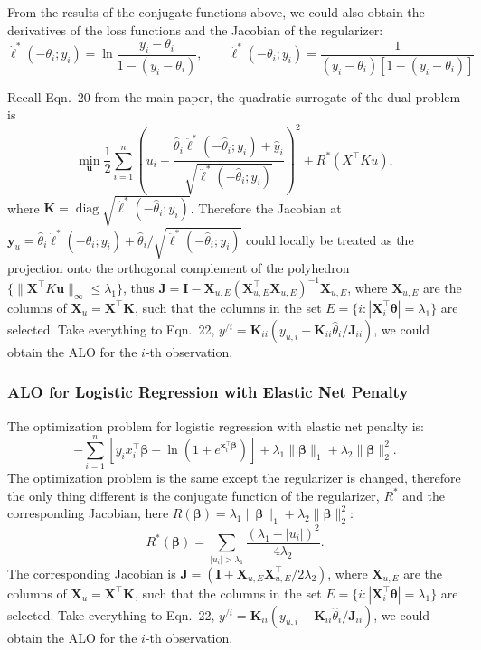 \documentclass[11pt]{article}
\newcommand{\bu}{\bm{u}}
\newcommand{\bx}{\bm{x}}
\newcommand{\by}{\bm{y}}
\newcommand{\bI}{\bm{I}}
\newcommand{\bJ}{\bm{J}}
\newcommand{\bK}{\bm{K}}
\newcommand{\bX}{\bm{X}}
\newcommand{\bbeta}{\bm{\beta}}
\newcommand{\btheta}{\bm{\theta}}
\DeclareMathOperator{\diag}{diag}
\newcommand{\refthm}[2]{#1~#2}
\begin{document}
From the results of the conjugate functions above, we could also obtain the derivatives of the loss functions and the Jacobian of the regularizer: \[\dot{\ell}^{*}(-\theta_{i};y_{i}) = \ln \frac{y_{i}-\theta_{i}}{1-(y_{i}-\theta_{i})},\qquad \ddot{\ell}^{*}(-\theta_{i};y_{i}) = \frac{1}{(y_{i}-\theta_{i})[1-(y_{i}-\theta_{i})]}\]

Recall \refthm{Eqn.}{20} from the main paper, the quadratic surrogate of the dual problem is \[\min\limits_{\bu} \frac{1}{2}\sum_{i=1}^n\left(u_{i}-\frac{\hat{\theta}_{i}\ddot{\ell}^{*}(-\hat{\theta}_{i};y_{i})+\hat{y}_{i}}{\sqrt{\ddot{\ell}^{*}(-\hat{\theta}_{i};y_{i})}}\right)^{2}+R^{*}(X^{\top}Ku),\] where $\bK=\diag\sqrt{\ddot{\ell}^{*}(-\hat{\theta}_{i};y_{i})}$. Therefore the Jacobian at $\by_{u} =\hat{\theta}_{i}\ddot{\ell}^{*}(-\hat{\theta}_{i};y_{i})+\hat{\theta}_{i}/\sqrt{\ddot{\ell}^{*}(-\hat{\theta}_{i};y_{i})}$ could locally be treated as the projection onto the orthogonal complement of the polyhedron $\{\|\bX^{\top}K\bu\|_{\infty} \leq \lambda_{1}\}$, thus $\bJ = \bI - \bX_{u,E}(\bX_{u,E}^{\top}\bX_{u,E})^{-1}\bX_{u,E}$, where $\bX_{u,E}$ are the columns of $\bX_{u}=\bX^{\top}\bK$, such that the columns in the set $E = \{i:|\bX_{i}^{\top}\btheta| = \lambda_{1}\}$ are selected. Take everything to \refthm{Eqn.}{22}, $y^{/i} = \bK_{ii}(y_{u,i}-\bK_{ii}\hat{\theta}_{i}/\bJ_{ii})$, we could obtain the ALO for the $i$-th observation.

\subsubsection{ALO for Logistic Regression with Elastic Net Penalty}
The optimization problem for logistic regression with elastic net penalty is: \[-\sum_{i=1}^n\left[y_{i}x_{i}^{\top}\bbeta+\ln\left(1+e^{\bx_{i}^{\top}\bbeta}\right)\right]+\lambda_{1}\|\bbeta\|_{1}+\lambda_{2}\|\bbeta\|_{2}^{2}.\]
The optimization problem is the same except the regularizer is changed, therefore the only thing different is the conjugate function of the regularizer, $R^{*}$ and the corresponding Jacobian, here $R(\bbeta) = \lambda_{1}\|\bbeta\|_{1}+\lambda_{2}\|\bbeta\|_{2}^{2}$: \[R^{*}(\bbeta) = \sum\limits_{|u_{i}| > \lambda_{1}} \frac{(\lambda_{1}-|u_{i}|)^{2}}{4\lambda_{2}}.\] The corresponding Jacobian is $\bJ = (\bI +\bX_{u,E}\bX_{u,E}^{\top}/2\lambda_{2})$, where $\bX_{u,E}$ are the columns of $\bX_{u}=\bX^{\top}\bK$, such that the columns in the set $E = \{i:|\bX_{i}^{\top}\btheta| = \lambda_{1}\}$ are selected. Take everything to \refthm{Eqn.}{22}, $y^{/i} = \bK_{ii}(y_{u,i}-\bK_{ii}\hat{\theta}_{i}/\bJ_{ii})$, we could obtain the ALO for the $i$-th observation.
\end{document}
